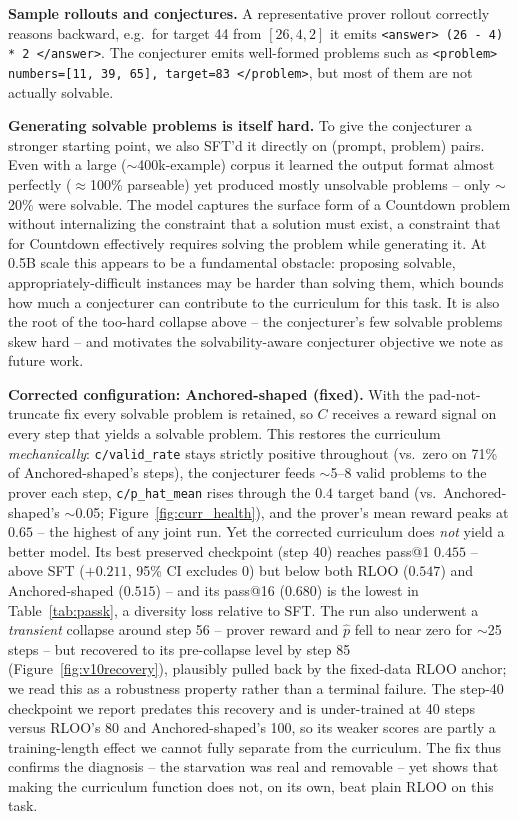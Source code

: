 \documentclass{article}
\begin{document}
\textbf{Sample rollouts and conjectures.} A representative prover rollout
correctly reasons backward, e.g.\ for target 44 from $[26,4,2]$ it emits
\texttt{<answer> (26 - 4) * 2 </answer>}. The conjecturer emits well-formed
problems such as \texttt{<problem> numbers=[11, 39, 65], target=83 </problem>},
but most of them are not actually solvable.

\textbf{Generating solvable problems is itself hard.} To give the conjecturer a
stronger starting point, we also SFT'd it directly on (prompt, problem) pairs.
Even with a large ($\sim$400k-example) corpus it learned the output format almost
perfectly ($\approx$100\% parseable) yet produced mostly unsolvable problems --
only $\sim$20\% were solvable. The model captures the surface form of a Countdown problem without
internalizing the constraint that a solution must exist, a constraint that for
Countdown effectively requires solving the problem while generating it. At 0.5B
scale this appears to be a fundamental obstacle: proposing solvable,
appropriately-difficult instances may be harder than solving them, which bounds
how much a conjecturer can contribute to the curriculum for this task. It is also
the root of the too-hard collapse above -- the conjecturer's few solvable problems
skew hard -- and motivates the solvability-aware conjecturer objective we note as
future work.

\textbf{Corrected configuration: Anchored-shaped (fixed).} With the pad-not-truncate
fix every solvable problem is retained, so $C$ receives a reward signal on every
step that yields a solvable problem. This restores the curriculum
\emph{mechanically}: \texttt{c/valid\_rate} stays strictly positive throughout (vs.\
zero on 71\% of Anchored-shaped's steps), the conjecturer feeds $\sim$5--8 valid
problems to the prover each step, \texttt{c/p\_hat\_mean} rises through the $0.4$
target band (vs.\ Anchored-shaped's $\sim$0.05; Figure~\ref{fig:curr_health}), and
the prover's mean reward peaks at $0.65$ -- the highest of any joint run. Yet the corrected curriculum does
\emph{not} yield a better model. Its best preserved checkpoint (step 40) reaches
pass@1 $0.455$ -- above SFT ($+0.211$, 95\% CI excludes 0) but below both RLOO
($0.547$) and Anchored-shaped ($0.515$) -- and its pass@16 ($0.680$) is the lowest
in Table~\ref{tab:passk}, a diversity loss relative to SFT. The run also underwent
a \emph{transient} collapse around step 56 -- prover reward and $\hat{p}$ fell to
near zero for $\sim$25 steps -- but recovered to its pre-collapse level by step 85
(Figure~\ref{fig:v10recovery}), plausibly pulled back by the fixed-data RLOO
anchor; we read this as a robustness property rather than a terminal failure. The
step-40 checkpoint we report predates this recovery and is under-trained at 40
steps versus RLOO's 80 and Anchored-shaped's 100, so its weaker scores are partly a
training-length effect we cannot fully separate from the curriculum. The fix thus
confirms the diagnosis -- the starvation was real and removable -- yet shows that
making the curriculum function does not, on its own, beat plain RLOO on this task.
\end{document}
